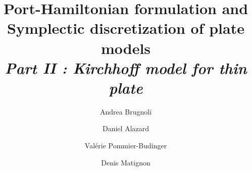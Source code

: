 \documentclass[preprint,12pt]{elsarticle}
\begin{document}
	
	\begin{frontmatter}	
		
		\title{Port-Hamiltonian formulation and \\
		Symplectic discretization of plate models\\
		\vspace{2mm} \large\textit{Part II : Kirchhoff model for thin plate}}	
		\author[ISAE]{Andrea Brugnoli}
		
		\author[ISAE]{Daniel Alazard}
		
		\author[ISAE]{Valérie Pommier-Budinger}
		
		\author[ISAE]{Denis Matignon}
		
		
		
	    \address[ISAE]{ISAE-SUPAERO, Université de Toulouse, France.\\
		\vspace{2mm} {10 Avenue Edouard Belin, BP-54032, 31055 Toulouse Cedex 4.}}
		

\end{frontmatter}
\end{document}

